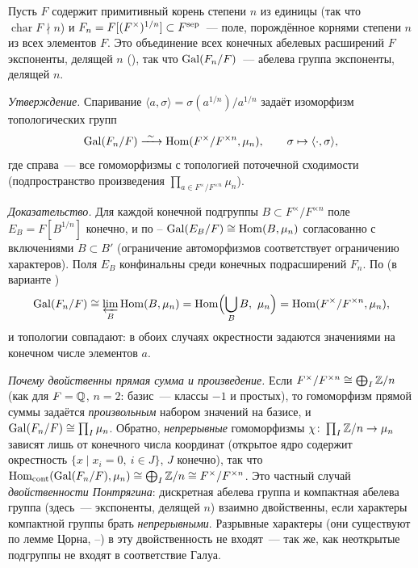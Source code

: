 \begin{example}[7.37]
Пусть $F$ содержит примитивный корень степени $n$ из единицы (так что $\operatorname{char}F\nmid n$) и
$F_n=F[(F^\times)^{1/n}]\subset F^{\mathrm{sep}}$~--- поле, порождённое корнями степени $n$ из всех элементов $F$. Это объединение всех
конечных абелевых расширений $F$ экспоненты, делящей $n$ (), так что $\operatorname{Gal}(F_n/F)$~--- абелева группа экспоненты,
делящей $n$.

\emph{Утверждение.} Спаривание $\langle a,\sigma\rangle=\sigma(a^{1/n})/a^{1/n}$ задаёт изоморфизм топологических групп
\[
\Gal(F_n/F)\xrightarrow{\ \sim\ }\Hom(F^\times/F^{\times n},\mu_n),\qquad\sigma\mapsto\langle\cdot,\sigma\rangle,
\]
где справа~--- все гомоморфизмы с топологией поточечной сходимости (подпространство произведения
$\prod_{a\in F^\times/F^{\times n}}\mu_n$).

\emph{Доказательство.} Для каждой конечной подгруппы $B\subset F^\times/F^{\times n}$ поле $E_B=F[B^{1/n}]$ конечно, и по
-- $\operatorname{Gal}(E_B/F)\cong\operatorname{Hom}(B,\mu_n)$ согласованно с включениями $B\subset B'$ (ограничение автоморфизмов
соответствует ограничению характеров). Поля $E_B$ конфинальны среди конечных подрасширений $F_n$. По  (в варианте
)
\[
\Gal(F_n/F)\cong\varlim_B\Hom(B,\mu_n)=\Hom\Bigl(\bigcup_BB,\ \mu_n\Bigr)=\Hom(F^\times/F^{\times n},\mu_n),
\]
и топологии совпадают: в обоих случаях окрестности задаются значениями на конечном числе элементов $a$.

\emph{Почему двойственны прямая сумма и произведение.} Если $F^\times/F^{\times n}\cong\bigoplus_I\mathbb Z/n$ (как для $F=\mathbb Q$,
$n=2$: базис~--- классы $-1$ и простых), то гомоморфизм прямой суммы задаётся \emph{произвольным} набором значений на
базисе, и $\operatorname{Gal}(F_n/F)\cong\prod_I\mu_n$. Обратно, \emph{непрерывные} гомоморфизмы $\chi\colon\prod_I\mathbb Z/n\to\mu_n$ зависят
лишь от конечного числа координат (открытое ядро содержит окрестность $\{x\mid x_i=0,\ i\in J\}$, $J$ конечно), так что
$\operatorname{Hom_{cont}}(\operatorname{Gal}(F_n/F),\mu_n)\cong\bigoplus_I\mathbb Z/n\cong F^\times/F^{\times n}$. Это частный случай \emph{двойственности
Понтрягина}: дискретная абелева группа и компактная абелева группа (здесь~--- экспоненты, делящей $n$) взаимно
двойственны, если характеры компактной группы брать \emph{непрерывными}. Разрывные характеры (они существуют по лемме
Цорна, --) в эту двойственность не входят~--- так же, как неоткрытые подгруппы не входят в соответствие Галуа.


\end{example}
